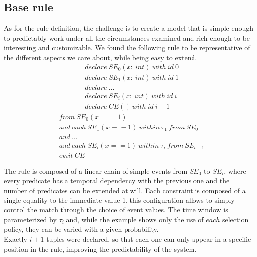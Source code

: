 \subsection{Base rule}
As for the rule definition, the challenge is to create a model that is simple enough to predictably work under all the circumstances examined and rich enough to be interesting and customizable. We found the following rule to be representative of the different aspects we care about, while being easy to extend.
\begin{align*}
&declare\ SE_0(x:\ int)\ with\ id\ 0\\
&declare\ SE_1(x:\ int)\ with\ id\ 1\\
&declare\ \ldots\\
&declare\ SE_i(x:\ int)\ with\ id\ i\\
&declare\ CE()\ with\ id\ i+1
\end{align*}
\begin{align*}
&from\ SE_0(x == 1)\\
&and\ each\ SE_1(x == 1)\ within\ \tau_1\ from\ SE_0\\
&and\ \ldots\\
&and\ each\ SE_i(x == 1)\ within\ \tau_i\ from\ SE_{i-1}\\
&emit\ CE
\end{align*}

The rule is composed of a linear chain of simple events from $SE_0$ to $SE_i$, where every predicate has a temporal dependency with the previous one and the number of predicates can be extended at will. Each constraint is composed of a single equality to the immediate value 1, this configuration allows to simply control the match through the choice of event values. The time window is parameterized by $\tau_i$ and, while the example shows only the use of $each$ selection policy, they can be varied with a given probability.\\
Exactly $i+1$ tuples were declared, so that each one can only appear in a specific position in the rule, improving the predictability of the system.

